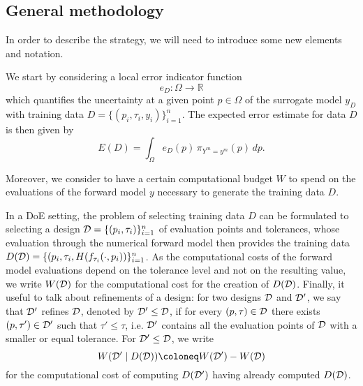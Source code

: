 \subsection{General methodology}\label{sec:AL-method}

In order to describe the strategy, we will need to introduce some new elements and notation. \medbreak 

We start by considering a local error indicator function 
\begin{equation} \label{eq:loc-err-ind}
    e_{D} : \Omega \to \mathbb R
\end{equation} 
which quantifies the uncertainty at a given point $p \in \Omega$ of the surrogate model $y_D$ with training data $D=\{(p_i, \tau_i, y_i)\}_{i=1}^n$.
The expected error estimate for data $D$ is then given by
\begin{equation} \label{eq:glob-err-ind}
    E(D) = \int_{\Omega} e_{D}(p) \, \pi_{ Y^m = y^m}(p) \, dp.
\end{equation}

Moreover, we consider to have a certain computational budget $W$ to spend on the evaluations of the forward model $y$ necessary to generate the training data $D$. \medbreak 

In a DoE setting, the problem of selecting training data $D$ can be formulated to selecting a design $\mathcal D = \{ (p_i, \tau_i) \}_{i=1}^n$ of evaluation points and tolerances, whose evaluation through the numerical forward model then provides the training data $D(\mathcal D) = \{ (p_i, \tau_i, H(f_{\tau_i}(\cdot, p_i)) \}_{i=1}^n$. \newline
As the computational costs of the forward model evaluations depend on the tolerance level and not on the resulting value, we write $W(\mathcal D)$ for the computational cost for the creation of $D(\mathcal D)$. \newline
Finally, it useful to talk about refinements of a design: for two designs $\mathcal D$ and $\mathcal D'$, we say that $\mathcal D'$ refines $\mathcal D$, denoted by $\mathcal D' \leq \mathcal D$, if for every $(p, \tau) \in \mathcal D$ there exists $(p, \tau') \in \mathcal D'$ such that $\tau' \leq \tau$, i.e.  $\mathcal D'$ contains all the evaluation points of $\mathcal D$ with a smaller or equal tolerance.
For $\mathcal D' \leq \mathcal D$, we write 
\[ 
W(\mc D' \mid D(\mc D)) \coloneq W(\mc D') - W(\mc D)
\] for the computational cost of computing $D(\mathcal D')$ having already computed $D(\mathcal D)$. \medbreak

